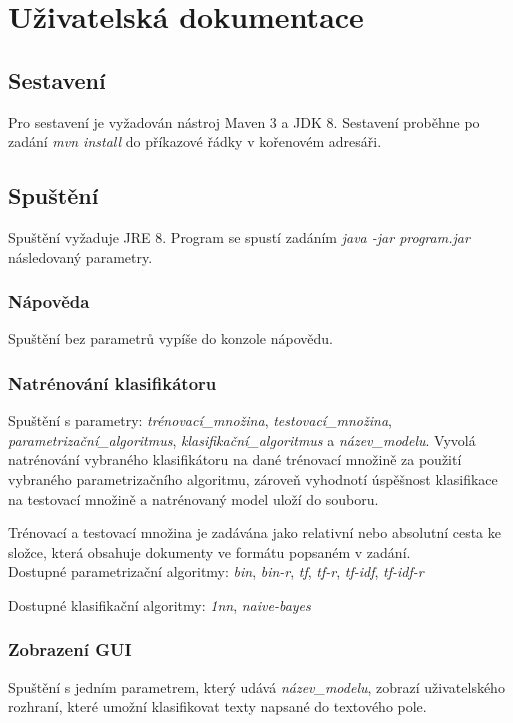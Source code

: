 \documentclass[12pt, a4paper]{report}
\begin{document}
\chapter{Uživatelská dokumentace}
\section{Sestavení}
Pro sestavení je vyžadován nástroj Maven 3 a JDK 8.
Sestavení proběhne po zadání \emph{mvn install} do příkazové řádky v kořenovém adresáři.

\section{Spuštění}
Spuštění vyžaduje JRE 8. Program se spustí zadáním \emph{java -jar program.jar} následovaný parametry.

\subsection*{Nápověda}
Spuštění bez parametrů vypíše do konzole nápovědu.

\subsection*{Natrénování klasifikátoru}
Spuštění s parametry: \emph{trénovací\_množina}, \emph{testovací\_množina}, \emph{parametrizační\_algoritmus},
\emph{klasifikační\_algoritmus} a \emph{název\_modelu}. Vyvolá natrénování vybraného klasifikátoru na dané trénovací množině za použití vybraného parametrizačního algoritmu, zároveň vyhodnotí úspěšnost klasifikace na testovací množině a natrénovaný model uloží do souboru.

Trénovací a testovací množina je zadávána jako relativní nebo absolutní cesta ke složce, která obsahuje dokumenty ve formátu popsaném v zadání.\\

Dostupné parametrizační algoritmy: \emph{bin}, \emph{bin-r}, \emph{tf}, \emph{tf-r}, \emph{tf-idf}, \emph{tf-idf-r}

Dostupné klasifikační algoritmy: \emph{1nn}, \emph{naive-bayes}

\subsection*{Zobrazení GUI}
Spuštění s jedním parametrem, který udává \emph{název\_modelu}, zobrazí uživatelského rozhraní, které umožní klasifikovat texty napsané do textového pole.
\end{document}
